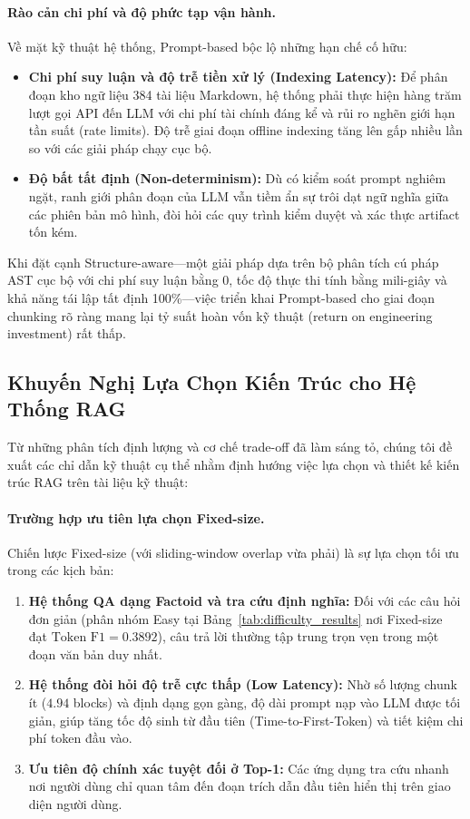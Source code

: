 \paragraph{Rào cản chi phí và độ phức tạp vận hành.}
Về mặt kỹ thuật hệ thống, Prompt-based bộc lộ những hạn chế cố hữu:
\begin{itemize}
    \item \textbf{Chi phí suy luận và độ trễ tiền xử lý (Indexing Latency):} Để phân đoạn kho ngữ liệu 384 tài liệu Markdown, hệ thống phải thực hiện hàng trăm lượt gọi API đến LLM với chi phí tài chính đáng kể và rủi ro nghẽn giới hạn tần suất (rate limits). Độ trễ giai đoạn offline indexing tăng lên gấp nhiều lần so với các giải pháp chạy cục bộ.
    \item \textbf{Độ bất tất định (Non-determinism):} Dù có kiểm soát prompt nghiêm ngặt, ranh giới phân đoạn của LLM vẫn tiềm ẩn sự trôi dạt ngữ nghĩa giữa các phiên bản mô hình, đòi hỏi các quy trình kiểm duyệt và xác thực artifact tốn kém.
\end{itemize}
Khi đặt cạnh Structure-aware---một giải pháp dựa trên bộ phân tích cú pháp AST cục bộ với chi phí suy luận bằng 0, tốc độ thực thi tính bằng mili-giây và khả năng tái lập tất định 100\%---việc triển khai Prompt-based cho giai đoạn chunking rõ ràng mang lại tỷ suất hoàn vốn kỹ thuật (return on engineering investment) rất thấp.

\subsection{Khuyến Nghị Lựa Chọn Kiến Trúc cho Hệ Thống RAG}
\label{subsec:architectural_recommendations}

Từ những phân tích định lượng và cơ chế trade-off đã làm sáng tỏ, chúng tôi đề xuất các chỉ dẫn kỹ thuật cụ thể nhằm định hướng việc lựa chọn và thiết kế kiến trúc RAG trên tài liệu kỹ thuật:

\paragraph{Trường hợp ưu tiên lựa chọn Fixed-size.}
Chiến lược Fixed-size (với sliding-window overlap vừa phải) là sự lựa chọn tối ưu trong các kịch bản:
\begin{enumerate}
    \item \textbf{Hệ thống QA dạng Factoid và tra cứu định nghĩa:} Đối với các câu hỏi đơn giản (phân nhóm Easy tại Bảng~\ref{tab:difficulty_results} nơi Fixed-size đạt $\text{Token F1} = 0.3892$), câu trả lời thường tập trung trọn vẹn trong một đoạn văn bản duy nhất.
    \item \textbf{Hệ thống đòi hỏi độ trễ cực thấp (Low Latency):} Nhờ số lượng chunk ít ($4.94$ blocks) và định dạng gọn gàng, độ dài prompt nạp vào LLM được tối giản, giúp tăng tốc độ sinh từ đầu tiên (Time-to-First-Token) và tiết kiệm chi phí token đầu vào.
    \item \textbf{Ưu tiên độ chính xác tuyệt đối ở Top-1:} Các ứng dụng tra cứu nhanh nơi người dùng chỉ quan tâm đến đoạn trích dẫn đầu tiên hiển thị trên giao diện người dùng.
\end{enumerate}

